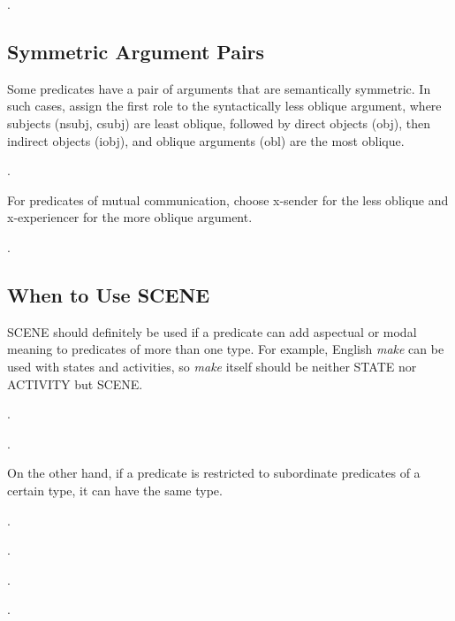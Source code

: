 \documentclass[a4paper]{article}
\newcommand{\fr}[1]{\textsf{#1}}
\newcommand{\rl}[1]{\textsf{#1}}
\begin{document}
\ex.


\newpage\subsection{Symmetric Argument Pairs}

Some predicates have a pair of arguments that are semantically symmetric. In
such cases, assign the first role to the syntactically less oblique argument,
where subjects (\rl{nsubj}, \rl{csubj}) are least oblique, followed by direct
objects (\rl{obj}), then indirect objects (\rl{iobj}), and oblique arguments
(\rl{obl}) are the most oblique.

\ex.

For predicates of mutual communication, choose \rl{x-sender} for the less
oblique and \rl{x-experiencer} for the more oblique argument.

\ex.


\newpage\subsection{When to Use \fr{SCENE}}

\fr{SCENE} should definitely be used if a predicate can add aspectual or modal
meaning to predicates of more than one type. For example, English \emph{make}
can be used with states and activities, so \emph{make} itself should be neither
\fr{STATE} nor \fr{ACTIVITY} but \fr{SCENE}.

\ex.

\ex.

On the other hand, if a predicate is restricted to subordinate predicates of a
certain type, it can have the same type.

\ex.

\ex.

\ex.

\ex.
\end{document}
